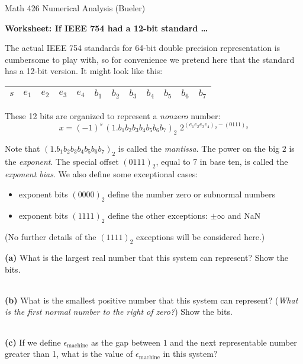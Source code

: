 \documentclass[12pt]{amsart}
\newcommand{\eps}{\epsilon}
\newcommand{\epart}[1]{\bigskip\noindent\textbf{(#1)}\quad }
\newcommand{\bitboxes}{
\large
\begin{center}
\begin{tabular}{|c|c|c|c|c|c|c|c|c|c|c|c|} \hline
\phantom{$e_1$} &
\phantom{$e_1$} &
\phantom{$e_1$} &
\phantom{$e_1$} &
\phantom{$e_1$} &
\phantom{$e_1$} &
\phantom{$e_1$} &
\phantom{$e_1$} &
\phantom{$e_1$} &
\phantom{$e_1$} &
\phantom{$e_1$} &
\phantom{$e_1$} \\ \hline
\end{tabular}
\end{center}
\normalsize}
\begin{document}
\scriptsize \noindent Math 426 Numerical Analysis (Bueler) \hfill {}
\normalsize\medskip

\Large\centerline{\textbf{Worksheet: If IEEE 754 had a 12-bit standard \dots}}
\medskip
\normalsize

\thispagestyle{empty}

The actual IEEE 754 standards for 64-bit double precision representation is cumbersome to play with, so for convenience we pretend here that the standard has a 12-bit version.  It might look like this:

\medskip\large
\begin{center}
\begin{tabular}{|c|c|c|c|c|c|c|c|c|c|c|c|} \hline
$s$ & $e_1$ & $e_2$ & $e_3$ & $e_4$ & $b_1$ & $b_2$ & $b_3$ & $b_4$ & $b_5$ & $b_6$ & $b_7$ \\ \hline
\end{tabular}
\end{center}
\medskip\normalsize

\noindent These 12 bits are organized to represent a \emph{nonzero} number:
\medskip\large
	$$x = (-1)^s\,(1.b_1 b_2 b_3 b_4 b_5 b_6 b_7)_2 \,\, 2^{(e_1 e_2 e_3 e_4)_2 - (0111)_2}$$
\normalsize

\noindent Note that $(1.b_1 b_2 b_3 b_4 b_5 b_6 b_7)_2$ is called the \emph{mantissa}.  The power on the big $2$ is the \emph{exponent}.  The special offset $(0111)_2$, equal to 7 in base ten, is called the \emph{exponent bias}.  We also define some exceptional cases:
\begin{itemize}
\item exponent bits $(0000)_2$ define the number zero or subnormal numbers
\item exponent bits $(1111)_2$ define the other exceptions: $\pm\infty$ and NaN
\end{itemize}
(No further details of the $(1111)_2$ exceptions will be considered here.)

\epart{a}  What is the largest real number that this system can represent?  Show the bits.

\bitboxes
\vfill

\epart{b}  What is the smallest positive number that this system can represent?  (\emph{What is the first normal number to the right of zero?})  Show the bits.

\bitboxes
\vfill

\epart{c}  If we define $\eps_{\text{machine}}$ as the gap between $1$ and the next representable number greater than 1, what is the value of $\eps_{\text{machine}}$ in this system?
\vfill
\end{document}

